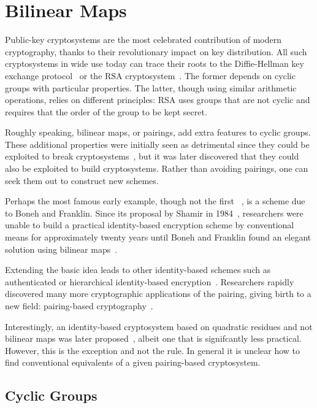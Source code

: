 \chapter{Bilinear Maps}

Public-key cryptosystems are the most celebrated contribution of modern
cryptography, thanks to their revolutionary impact on key distribution. All
such cryptosystems in wide use today can trace their roots to the
Diffie-Hellman key exchange protocol~\cite{diffie76new} or the RSA
cryptosystem~\cite{RSA}. The former depends on cyclic groups with particular
properties. The latter, though using similar arithmetic operations, relies on
different principles: RSA uses groups that are not cyclic and requires that the
order of the group to be kept secret.

Roughly speaking, bilinear maps, or pairings, add extra features to cyclic
groups. These additional properties were initially seen as detrimental since
they could be exploited to break cryptosystems~\cite{mov, fr, fmr}, but it was
later discovered that they could also be exploited to build cryptosystems.
Rather than avoiding pairings, one can seek them out to construct new schemes.

Perhaps the most famous early example, though not the first ~\cite{sok, j}, is
a scheme due to Boneh and Franklin. Since its proposal by Shamir in
1984~\cite{shamir1984}, researchers were unable to build a practical
identity-based encryption scheme by conventional means for approximately twenty
years until Boneh and Franklin found an elegant solution using bilinear
maps~\cite{bf}.

Extending the basic idea leads to other identity-based schemes such as
authenticated or hierarchical identity-based encryption~\cite{l, hl}.
Researchers rapidly discovered many more cryptographic applications of the
pairing, giving birth to a new field: pairing-based
cryptography~\cite{thelounge}.

Interestingly, an identity-based cryptosystem based on quadratic residues and
not bilinear maps was later proposed~\cite{cocks01, bgh}, albeit one that is
signifcantly less practical. However, this is the exception and not the rule.
In general it is unclear how to find conventional equivalents of a given
pairing-based cryptosystem.

\section{Cyclic Groups}

